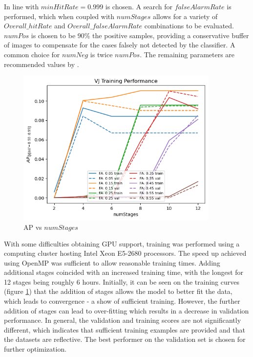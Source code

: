 \documentclass[a4paper,twoside,12pt]{report}
\begin{document}
In line with \cite{robovj} $minHitRate = 0.999$ is chosen. A search for $falseAlarmRate$ is performed, which when coupled with $numStages$ allows for a variety of $Overall\_hitRate$ and $Overall\_falseAlarmRate$ combinations to be evaluated. $numPos$ is chosen to be 90\% the positive samples, providing a conservative buffer of images to compensate for the cases falsely not detected by the classifier. A common choice for $numNeg$ is twice $numPos$. The remaining parameters are recommended values by \cite{vjdataset}.

\begin{figure}[h!]
\begin{center}
\includegraphics[width=10cm]{images/vj_training.png}
\caption{AP vs $numStages$}
\label{fig:vjstages}
\end{center}
\end{figure}

With some difficulties obtaining GPU support, training was performed using a computing cluster hosting Intel Xeon E5-2680 processors. The speed up achieved using OpenMP was sufficient to allow reasonable training times. Adding additional stages coincided with an increased training time, with the longest for 12 stages being roughly 6 hours. Initially, it can be seen on the training curves (figure \ref{fig:vjstages}) that the addition of stages allows the model to better fit the data, which leads to convergence - a show of sufficient training. However, the further addition of stages can lead to over-fitting which results in a decrease in validation performance. In general, the validation and training scores are not significantly different, which indicates that sufficient training examples are provided and that the datasets are reflective. The best performer on the validation set is chosen for further optimization.
\end{document}

